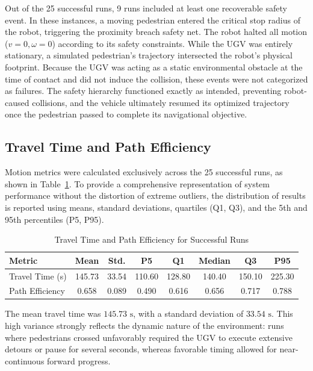 Out of the 25 successful runs, 9 runs included at least one recoverable safety event. In these instances, a moving pedestrian entered the critical stop radius of the robot, triggering the proximity breach safety net. The robot halted all motion ($v = 0, \omega = 0$) according to its safety constraints. While the UGV was entirely stationary, a simulated pedestrian's trajectory intersected the robot's physical footprint. Because the UGV was acting as a static environmental obstacle at the time of contact and did not induce the collision, these events were not categorized as failures. The safety hierarchy functioned exactly as intended, preventing robot-caused collisions, and the vehicle ultimately resumed its optimized trajectory once the pedestrian passed to complete its navigational objective.

\subsection{Travel Time and Path Efficiency}
\label{subsec:results-travel-time}

Motion metrics were calculated exclusively across the 25 successful runs, as shown in Table~\ref{tab:motion-results}. To provide a comprehensive representation of system performance without the distortion of extreme outliers, the distribution of results is reported using means, standard deviations, quartiles (Q1, Q3), and the 5th and 95th percentiles (P5, P95).

\begin{table}[htpb]
    \centering
    \caption{Travel Time and Path Efficiency for Successful Runs}
    \label{tab:motion-results}
    \begin{tabular}{lccccccc}
        \hline
        \textbf{Metric} & \textbf{Mean} & \textbf{Std.} & \textbf{P5} & \textbf{Q1} & \textbf{Median} & \textbf{Q3} & \textbf{P95} \\
        \hline
        Travel Time (s) & 145.73 & 33.54 & 110.60 & 128.80 & 140.40 & 150.10 & 225.30 \\
        Path Efficiency & 0.658 & 0.089 & 0.490 & 0.616 & 0.656 & 0.717 & 0.788 \\
        \hline
    \end{tabular}
\end{table}

The mean travel time was $145.73\text{ s}$, with a standard deviation of $33.54\text{ s}$. This high variance strongly reflects the dynamic nature of the environment: runs where pedestrians crossed unfavorably required the UGV to execute extensive detours or pause for several seconds, whereas favorable timing allowed for near-continuous forward progress. 

